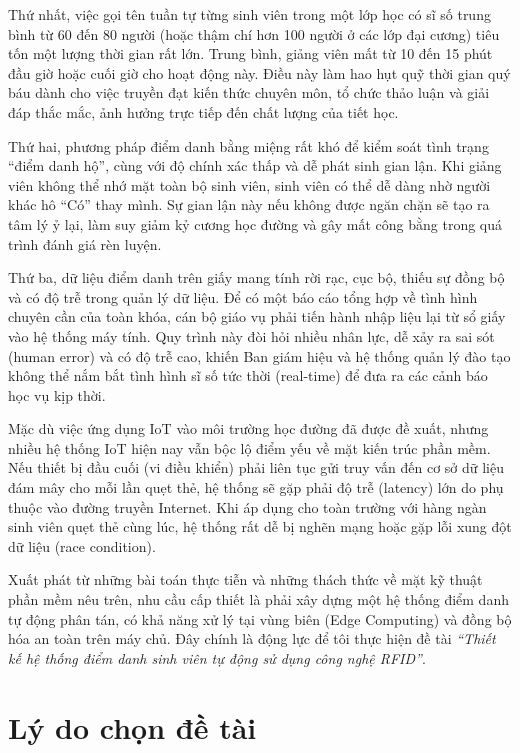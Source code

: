 \documentclass[12pt,a4paper]{report}
\begin{document}
Thứ nhất, việc gọi tên tuần tự từng sinh viên trong một lớp học có sĩ số trung bình từ 60 đến 80 người (hoặc thậm chí hơn 100 người ở các lớp đại cương) tiêu tốn một lượng thời gian rất lớn. Trung bình, giảng viên mất từ 10 đến 15 phút đầu giờ hoặc cuối giờ cho hoạt động này. Điều này làm hao hụt quỹ thời gian quý báu dành cho việc truyền đạt kiến thức chuyên môn, tổ chức thảo luận và giải đáp thắc mắc, ảnh hưởng trực tiếp đến chất lượng của tiết học.

Thứ hai, phương pháp điểm danh bằng miệng rất khó để kiểm soát tình trạng ``điểm danh hộ'', cùng với độ chính xác thấp và dễ phát sinh gian lận. Khi giảng viên không thể nhớ mặt toàn bộ sinh viên, sinh viên có thể dễ dàng nhờ người khác hô ``Có'' thay mình. Sự gian lận này nếu không được ngăn chặn sẽ tạo ra tâm lý ỷ lại, làm suy giảm kỷ cương học đường và gây mất công bằng trong quá trình đánh giá rèn luyện.

Thứ ba, dữ liệu điểm danh trên giấy mang tính rời rạc, cục bộ, thiếu sự đồng bộ và có độ trễ trong quản lý dữ liệu. Để có một báo cáo tổng hợp về tình hình chuyên cần của toàn khóa, cán bộ giáo vụ phải tiến hành nhập liệu lại từ sổ giấy vào hệ thống máy tính. Quy trình này đòi hỏi nhiều nhân lực, dễ xảy ra sai sót (human error) và có độ trễ cao, khiến Ban giám hiệu và hệ thống quản lý đào tạo không thể nắm bắt tình hình sĩ số tức thời (real-time) để đưa ra các cảnh báo học vụ kịp thời.

Mặc dù việc ứng dụng IoT vào môi trường học đường đã được đề xuất, nhưng nhiều hệ thống IoT hiện nay vẫn bộc lộ điểm yếu về mặt kiến trúc phần mềm. Nếu thiết bị đầu cuối (vi điều khiển) phải liên tục gửi truy vấn đến cơ sở dữ liệu đám mây cho mỗi lần quẹt thẻ, hệ thống sẽ gặp phải độ trễ (latency) lớn do phụ thuộc vào đường truyền Internet. Khi áp dụng cho toàn trường với hàng ngàn sinh viên quẹt thẻ cùng lúc, hệ thống rất dễ bị nghẽn mạng hoặc gặp lỗi xung đột dữ liệu (race condition).

Xuất phát từ những bài toán thực tiễn và những thách thức về mặt kỹ thuật phần mềm nêu trên, nhu cầu cấp thiết là phải xây dựng một hệ thống điểm danh tự động phân tán, có khả năng xử lý tại vùng biên (Edge Computing) và đồng bộ hóa an toàn trên máy chủ. Đây chính là động lực để tôi thực hiện đề tài \textit{``Thiết kế hệ thống điểm danh sinh viên tự động sử dụng công nghệ RFID''}.

\section{Lý do chọn đề tài}
\end{document}
